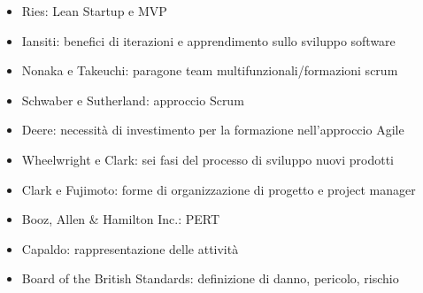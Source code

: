\documentclass[answers, a4paper, 11pt]{exam}
\begin{document}
\begin{itemize}
    \item Ries: Lean Startup e MVP
    \item Iansiti: benefici di iterazioni e apprendimento sullo sviluppo software
    \item Nonaka e Takeuchi: paragone team multifunzionali/formazioni scrum
    \item Schwaber e Sutherland: approccio Scrum
    \item Deere: necessità di investimento per la formazione nell'approccio Agile
    \item Wheelwright e Clark: sei fasi del processo di sviluppo nuovi prodotti
    \item Clark e Fujimoto: forme di organizzazione di progetto e project manager
    \item Booz, Allen & Hamilton Inc.: PERT
    \item Capaldo: rappresentazione delle attività
    \item Board of the British Standards: definizione di danno, pericolo, rischio
\end{itemize}
\end{document}
